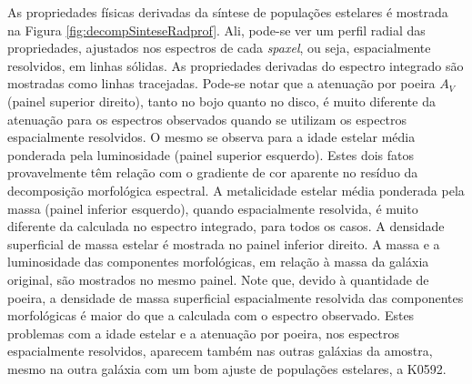 As propriedades físicas derivadas da síntese de populações estelares é mostrada
na Figura \ref{fig:decompSinteseRadprof}. Ali, pode-se ver um perfil radial das
propriedades, ajustados nos espectros de cada {\em spaxel}, ou seja,
espacialmente resolvidos, em linhas sólidas. As propriedades derivadas do
espectro integrado são mostradas como linhas tracejadas. Pode-se notar que a
atenuação por poeira $A_V$ (painel superior direito), tanto no bojo quanto no
disco, é muito diferente da atenuação para os espectros observados quando se
utilizam os espectros espacialmente resolvidos. O mesmo se observa para a idade
estelar média ponderada pela luminosidade (painel superior esquerdo). Estes dois
fatos provavelmente têm relação com o gradiente de cor aparente no resíduo da
decomposição morfológica espectral. A metalicidade estelar média ponderada pela
massa (painel inferior esquerdo), quando espacialmente resolvida, é muito
diferente da calculada no espectro integrado, para todos os casos. A densidade
superficial de massa estelar é mostrada no painel inferior direito. A massa e a
luminosidade das componentes morfológicas, em relação à massa da galáxia
original, são mostrados no mesmo painel. Note que, devido à quantidade de
poeira, a densidade de massa superficial espacialmente resolvida das componentes
morfológicas é maior do que a calculada com o espectro observado. Estes
problemas com a idade estelar e a atenuação por poeira, nos espectros
espacialmente resolvidos, aparecem também nas outras galáxias da amostra, mesmo
na outra galáxia com um bom ajuste de populações estelares, a K0592.


